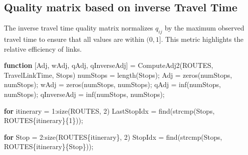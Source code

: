 \documentclass[
  letterpaper,
  DIV=11,
  numbers=noendperiod]{scrartcl}
\newenvironment{Shaded}{\begin{snugshade}}{\end{snugshade}}
\newcommand{\FloatTok}[1]{\textcolor[rgb]{0.68,0.00,0.00}{#1}}
\newcommand{\KeywordTok}[1]{\textcolor[rgb]{0.00,0.23,0.31}{\textbf{#1}}}
\newcommand{\NormalTok}[1]{\textcolor[rgb]{0.00,0.23,0.31}{#1}}
\newcommand{\OperatorTok}[1]{\textcolor[rgb]{0.37,0.37,0.37}{#1}}
\newcommand{\VariableTok}[1]{\textcolor[rgb]{0.07,0.07,0.07}{#1}}
\begin{document}
\subsection{Quality matrix based on inverse Travel
Time}\label{quality-matrix-based-on-inverse-travel-time}

The inverse travel time quality matrix normalizes \(q_{ij}\) by the
maximum observed travel time to ensure that all values are within
\((0,1]\). This metric highlights the relative efficiency of links.

\begin{Shaded}
\begin{Highlighting}[]
\KeywordTok{function}\NormalTok{ [}\VariableTok{Adj}\OperatorTok{,} \VariableTok{wAdj}\OperatorTok{,} \VariableTok{qAdj}\OperatorTok{,} \VariableTok{qInverseAdj}\NormalTok{] }\OperatorTok{=} \VariableTok{ComputeAdj2}\NormalTok{(}\VariableTok{ROUTES}\OperatorTok{,} \VariableTok{TravelLinkTime}\OperatorTok{,} \VariableTok{Stops}\NormalTok{)}
    \VariableTok{numStops} \OperatorTok{=} \VariableTok{length}\NormalTok{(}\VariableTok{Stops}\NormalTok{)}\OperatorTok{;}
    \VariableTok{Adj} \OperatorTok{=} \VariableTok{zeros}\NormalTok{(}\VariableTok{numStops}\OperatorTok{,} \VariableTok{numStops}\NormalTok{)}\OperatorTok{;}
    \VariableTok{wAdj} \OperatorTok{=} \VariableTok{zeros}\NormalTok{(}\VariableTok{numStops}\OperatorTok{,} \VariableTok{numStops}\NormalTok{)}\OperatorTok{;}
    \VariableTok{qAdj} \OperatorTok{=} \VariableTok{inf}\NormalTok{(}\VariableTok{numStops}\OperatorTok{,} \VariableTok{numStops}\NormalTok{)}\OperatorTok{;}
    \VariableTok{qInverseAdj} \OperatorTok{=} \VariableTok{inf}\NormalTok{(}\VariableTok{numStops}\OperatorTok{,} \VariableTok{numStops}\NormalTok{)}\OperatorTok{;}

    \KeywordTok{for} \VariableTok{itinerary} \OperatorTok{=} \FloatTok{1}\OperatorTok{:}\VariableTok{size}\NormalTok{(}\VariableTok{ROUTES}\OperatorTok{,} \FloatTok{2}\NormalTok{)}
        \VariableTok{LastStopIdx} \OperatorTok{=} \VariableTok{find}\NormalTok{(}\VariableTok{strcmp}\NormalTok{(}\VariableTok{Stops}\OperatorTok{,} \VariableTok{ROUTES}\NormalTok{\{}\VariableTok{itinerary}\NormalTok{\}\{}\FloatTok{1}\NormalTok{\}))}\OperatorTok{;}

        \KeywordTok{for} \VariableTok{Stop} \OperatorTok{=} \FloatTok{2}\OperatorTok{:}\VariableTok{size}\NormalTok{(}\VariableTok{ROUTES}\NormalTok{\{}\VariableTok{itinerary}\NormalTok{\}}\OperatorTok{,} \FloatTok{2}\NormalTok{)}
            \VariableTok{StopIdx} \OperatorTok{=} \VariableTok{find}\NormalTok{(}\VariableTok{strcmp}\NormalTok{(}\VariableTok{Stops}\OperatorTok{,} \VariableTok{ROUTES}\NormalTok{\{}\VariableTok{itinerary}\NormalTok{\}\{}\VariableTok{Stop}\NormalTok{\}))}\OperatorTok{;}


\end{Highlighting}
\end{Shaded}
\end{document}
